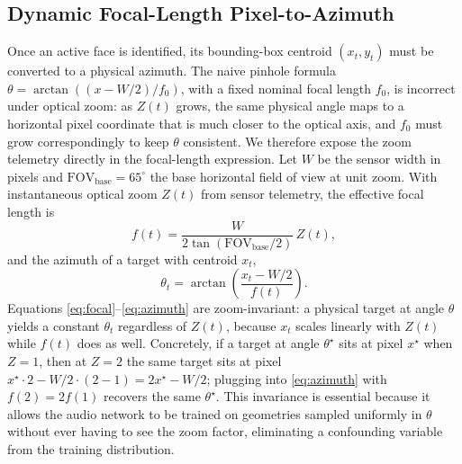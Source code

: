 \documentclass[journal,10pt]{IEEEtran}
\begin{document}
\subsection{Dynamic Focal-Length Pixel-to-Azimuth}
Once an active face is identified, its bounding-box centroid \((x_t,y_t)\) must be converted to a physical azimuth. The naive pinhole formula \(\theta=\arctan((x-W/2)/f_0)\), with a fixed nominal focal length \(f_0\), is incorrect under optical zoom: as \(Z(t)\) grows, the same physical angle maps to a horizontal pixel coordinate that is much closer to the optical axis, and \(f_0\) must grow correspondingly to keep \(\theta\) consistent. We therefore expose the zoom telemetry directly in the focal-length expression. Let \(W\) be the sensor width in pixels and \(\mathrm{FOV}_{\mathrm{base}}=65^\circ\) the base horizontal field of view at unit zoom. With instantaneous optical zoom \(Z(t)\) from sensor telemetry, the effective focal length is
\begin{equation}
f(t)=\frac{W}{2\tan(\mathrm{FOV}_{\mathrm{base}}/2)}\,Z(t),
\label{eq:focal}
\end{equation}
and the azimuth of a target with centroid \(x_t\),
\begin{equation}
\theta_t=\arctan\!\left(\frac{x_t-W/2}{f(t)}\right).
\label{eq:azimuth}
\end{equation}
Equations \eqref{eq:focal}--\eqref{eq:azimuth} are zoom-invariant: a physical target at angle \(\theta\) yields a constant \(\theta_t\) regardless of \(Z(t)\), because \(x_t\) scales linearly with \(Z(t)\) while \(f(t)\) does as well. Concretely, if a target at angle \(\theta^\star\) sits at pixel \(x^\star\) when \(Z=1\), then at \(Z=2\) the same target sits at pixel \(x^\star\cdot 2 - W/2\cdot(2-1) = 2x^\star - W/2\); plugging into \eqref{eq:azimuth} with \(f(2)=2f(1)\) recovers the same \(\theta^\star\). This invariance is essential because it allows the audio network to be trained on geometries sampled uniformly in \(\theta\) without ever having to see the zoom factor, eliminating a confounding variable from the training distribution.
\end{document}
